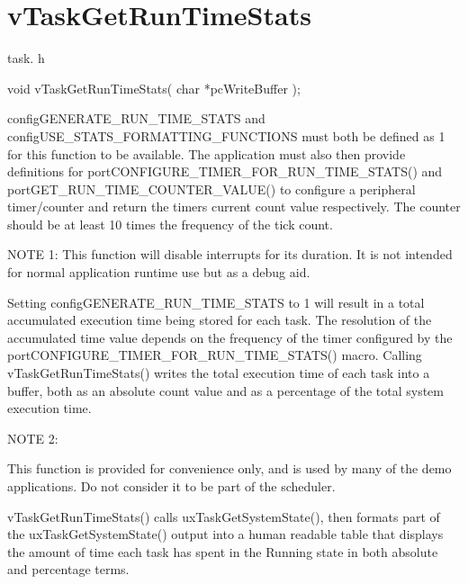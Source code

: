 \hypertarget{group__v_task_get_run_time_stats}{}\section{v\+Task\+Get\+Run\+Time\+Stats}
\label{group__v_task_get_run_time_stats}
task. h 
\begin{DoxyPre}void vTaskGetRunTimeStats( char *pcWriteBuffer );\end{DoxyPre}


config\+G\+E\+N\+E\+R\+A\+T\+E\+\_\+\+R\+U\+N\+\_\+\+T\+I\+M\+E\+\_\+\+S\+T\+A\+T\+S and config\+U\+S\+E\+\_\+\+S\+T\+A\+T\+S\+\_\+\+F\+O\+R\+M\+A\+T\+T\+I\+N\+G\+\_\+\+F\+U\+N\+C\+T\+I\+O\+N\+S must both be defined as 1 for this function to be available. The application must also then provide definitions for port\+C\+O\+N\+F\+I\+G\+U\+R\+E\+\_\+\+T\+I\+M\+E\+R\+\_\+\+F\+O\+R\+\_\+\+R\+U\+N\+\_\+\+T\+I\+M\+E\+\_\+\+S\+T\+A\+T\+S() and port\+G\+E\+T\+\_\+\+R\+U\+N\+\_\+\+T\+I\+M\+E\+\_\+\+C\+O\+U\+N\+T\+E\+R\+\_\+\+V\+A\+L\+U\+E() to configure a peripheral timer/counter and return the timers current count value respectively. The counter should be at least 10 times the frequency of the tick count.

N\+O\+T\+E 1\+: This function will disable interrupts for its duration. It is not intended for normal application runtime use but as a debug aid.

Setting config\+G\+E\+N\+E\+R\+A\+T\+E\+\_\+\+R\+U\+N\+\_\+\+T\+I\+M\+E\+\_\+\+S\+T\+A\+T\+S to 1 will result in a total accumulated execution time being stored for each task. The resolution of the accumulated time value depends on the frequency of the timer configured by the port\+C\+O\+N\+F\+I\+G\+U\+R\+E\+\_\+\+T\+I\+M\+E\+R\+\_\+\+F\+O\+R\+\_\+\+R\+U\+N\+\_\+\+T\+I\+M\+E\+\_\+\+S\+T\+A\+T\+S() macro. Calling v\+Task\+Get\+Run\+Time\+Stats() writes the total execution time of each task into a buffer, both as an absolute count value and as a percentage of the total system execution time.

N\+O\+T\+E 2\+:

This function is provided for convenience only, and is used by many of the demo applications. Do not consider it to be part of the scheduler.

v\+Task\+Get\+Run\+Time\+Stats() calls ux\+Task\+Get\+System\+State(), then formats part of the ux\+Task\+Get\+System\+State() output into a human readable table that displays the amount of time each task has spent in the Running state in both absolute and percentage terms.

